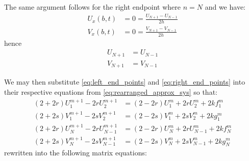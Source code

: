 The same argument follows for the right endpoint where $n=N$ and we have:
\begin{subequations}
\begin{align}
    U_x(b,t) &= 0 = \frac{{U_{N+1}} - U_{N-1}}{2h} \\
    V_x(b,t) &= 0 = \frac{{V_{N+1}} - V_{N-1}}{2h}
\end{align}
\end{subequations}
hence
\begin{subequations} \label{eq:right_end_points}
\begin{align}
    U_{N+1} &= U_{N-1} \\
    V_{N+1} &= V_{N-1}
\end{align}
\end{subequations}

We may then substitute \eqref{eq:left_end_points} and
\eqref{eq:right_end_points} into their respective equations from
\eqref{eq:rearranged_approx_sys} so that:
\begin{subequations} \label{eq:rearranged_approx_sys_endpoints}
\begin{align}
    (2+2r) U_{1}^{m+1} - 2r U_{2}^{m+1} &=
        (2-2r) U_{1}^{m} + 2r U_{2}^{m} + 2k f_{1}^{m}
        \\
    (2+2s) V_{1}^{m+1} - 2s V_{2}^{m+1} &=
        (2-2s) V_{1}^{m} + 2s V_{2}^{m} + 2k g_{1}^{m}
        \\
    (2+2r) U_{N}^{m+1} - 2r U_{N-1}^{m+1} &=
        (2-2r) U_{N}^{m} + 2r U_{N-1}^{m} + 2k f_{N}^{m}
        \\
    (2+2s) V_{N}^{m+1} - 2s V_{N-1}^{m+1} &=
        (2-2s) V_{N}^{m} + 2s V_{N-1}^{m} + 2k g_{N}^{m}
\end{align}
\end{subequations}
rewritten into the following matrix equations:
